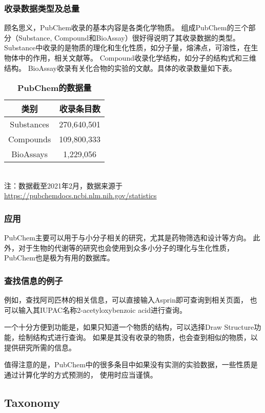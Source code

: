 \documentclass[cn,black,12pt,normal]{elegantnote}
\newcommand{\upcite}[1]{\textsuperscript{\textsuperscript{\cite{#1}}}}
\begin{document}
\subsubsection{收录数据类型及总量}
顾名思义，PubChem收录的基本内容是各类化学物质。
组成PubChem的三个部分（Substance, Compound和BioAssay）很好得说明了其收录数据的类型。
Substance中收录的是物质的理化和生化性质，如分子量，熔沸点，可溶性，在生物体中的作用，相关文献等。
Compound收录化学结构，如分子的结构式和三维结构。
BioAssay收录有关化合物的实验的文献。具体的收录数量如下表。
\begin{table}[H]
    \caption{\textbf{PubChem的数据量}}
    \centering
    \begin{tabular}{cc}
        \toprule
        类别&收录条目数\\
        \midrule
        Substances&270,640,501\\
        Compounds&109,800,333\\
        BioAssays&1,229,056\\
        \bottomrule
    \end{tabular}
    \\\tiny{注：数据截至2021年2月，数据来源于\url{https://pubchemdocs.ncbi.nlm.nih.gov/statistics}}
\end{table}
\subsubsection{应用}
PubChem主要可以用于与小分子相关的研究，尤其是药物筛选和设计等方向。
此外，对于生物的代谢等的研究也会使用到众多小分子的理化与生化性质，PubChem也是极为有用的数据库。
\subsubsection{查找信息的例子}
例如，查找阿司匹林的相关信息，可以直接输入Asprin即可查询到相关页面，
也可以输入其IUPAC名称2-acetyloxybenzoic acid进行查询。

一个十分方便到功能是，如果只知道一个物质的结构，可以选择Draw Structure功能，绘制结构式进行查询。
如果是其没有收录的物质，也会查到相似的物质，以提供研究所需的信息。

值得注意的是，PubChem中的很多条目中如果没有实测的实验数据，一些性质是通过计算化学的方式预测的，
使用时应当谨慎。

\subsection{Taxonomy\upcite{federhen2012ncbi}}
\end{document}
